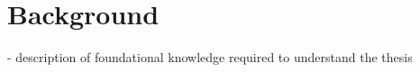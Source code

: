 \chapter{Background}
\label{ch:background}



- description of foundational knowledge required to understand the thesis